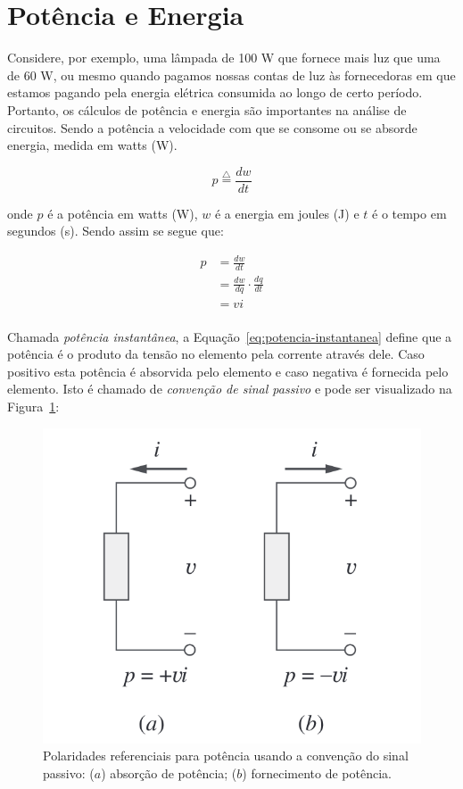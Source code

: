\section{Potência e Energia}

Considere, por exemplo, uma lâmpada de 100 W que fornece mais luz que uma de 60
W, ou mesmo quando pagamos nossas contas de luz às fornecedoras em que estamos
pagando pela energia elétrica consumida ao longo de certo período. Portanto, os
cálculos de potência e energia são importantes na análise de circuitos. Sendo a
potência a velocidade com que se consome ou se absorde energia, medida em
watts (W).

\begin{equation}
	\label{eq:potencia}
	p \overset{\triangle}{=} \frac{dw}{dt}
\end{equation}

onde \( p \) é a potência em watts (W), \( w \) é a energia em joules (J) e \( t
\) é o tempo em segundos (s). Sendo assim se segue que:

\begin{equation}
	\begin{aligned}
		\label{eq:potencia-instantanea}
		p & = \frac{dw}{dt}                     \\
		  & = \frac{dw}{dq} \cdot \frac{dq}{dt} \\
		  & = vi                                \\
	\end{aligned}
\end{equation}

Chamada \textit{potência instantânea}, a Equação~\ref{eq:potencia-instantanea}
define que a potência é o produto da tensão no elemento pela corrente através
dele. Caso positivo esta potência é absorvida pelo elemento e caso negativa é
fornecida pelo elemento. Isto é chamado de \textit{convenção de sinal passivo} e
pode ser visualizado na Figura~\ref{fig:fig3}:

\begin{figure}[H]
	\centering
	\setlength{\fboxsep}{0pt}
	\includegraphics[height=0.15\textwidth]{./fig/fig3.png}
	\caption{Polaridades referenciais para potência usando a convenção do sinal
		passivo: (\( a \)) absorção de potência; (\( b \)) fornecimento de potência.}
	\label{fig:fig3}
\end{figure}


